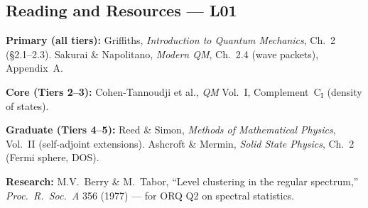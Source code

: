 \subsection*{Reading and Resources — L01}
\begin{tcolorbox}[goldbox]
\textbf{Primary (all tiers):}
Griffiths, \textit{Introduction to Quantum Mechanics}, Ch.~2 (\S2.1--2.3).
Sakurai \& Napolitano, \textit{Modern QM}, Ch.~2.4 (wave packets), Appendix~A.

\textbf{Core (Tiers 2–3):}
Cohen-Tannoudji et al., \textit{QM} Vol.~I, Complement~C$_\mathrm{I}$ (density of states).

\textbf{Graduate (Tiers 4–5):}
Reed \& Simon, \textit{Methods of Mathematical Physics}, Vol.~II (self-adjoint extensions).
Ashcroft \& Mermin, \textit{Solid State Physics}, Ch.~2 (Fermi sphere, DOS).

\textbf{Research:}
M.V.\ Berry \& M.\ Tabor, ``Level clustering in the regular spectrum,'' \textit{Proc.\ R.\ Soc.\ A} 356 (1977) — for ORQ Q2 on spectral statistics.
\end{tcolorbox}
